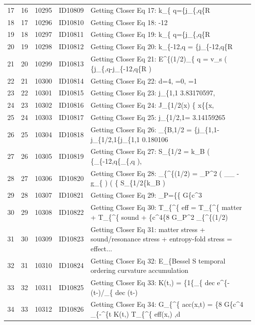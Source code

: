 \documentclass[11pt]{article}
\theoremstyle{remark}
\begin{document}
\begin{table}[H]
\begin{tabularx}{\textwidth}{rrrrL{7.2cm}}
17 & 16 & 10295 & ID10809 & Getting Closer Eq 17: k\_\{ q=\{j\_\{,q\{R \\
18 & 17 & 10296 & ID10810 & Getting Closer Eq 18: -12 \\
19 & 18 & 10297 & ID10811 & Getting Closer Eq 19: k\_\{ q=\{j\_\{,q\{R \\
20 & 19 & 10298 & ID10812 & Getting Closer Eq 20: k\_\{-12,q = \{j\_\{-12,q\{R \\
21 & 20 & 10299 & ID10813 & Getting Closer Eq 21: E\textasciicircum{}\{(1/2)\_\{ q = v\_s ( \{j\_\{,q-j\_\{-12,q\{R ) \\
22 & 21 & 10300 & ID10814 & Getting Closer Eq 22: d=4, =0, =1 \\
23 & 22 & 10301 & ID10815 & Getting Closer Eq 23: j\_\{1,1 3.83170597, \\
24 & 23 & 10302 & ID10816 & Getting Closer Eq 24: J\_\{1/2(x) \{ x\{\{x, \\
25 & 24 & 10303 & ID10817 & Getting Closer Eq 25: j\_\{1/2,1= 3.14159265 \\
26 & 25 & 10304 & ID10818 & Getting Closer Eq 26: \_\{B,1/2 = \{j\_\{1,1-j\_\{1/2,1\{j\_\{1,1 0.180106 \\
27 & 26 & 10305 & ID10819 & Getting Closer Eq 27: S\_\{1/2 = k\_B ( \{\_\{-12,q\{\_\{,q ), \\
28 & 27 & 10306 & ID10820 & Getting Closer Eq 28: \_\{\textasciicircum{}\{(1/2) = \_P\textasciicircum{}2 ( \_\_ - g\_\{ ) ( \{ S\_\{1/2\{k\_B ) \\
29 & 28 & 10307 & ID10821 & Getting Closer Eq 29: \_P=\{\{ G\{c\textasciicircum{}3 \\
30 & 29 & 10308 & ID10822 & Getting Closer Eq 30: T\_\{\textasciicircum{}\{ eff = T\_\{\textasciicircum{}\{ matter + T\_\{\textasciicircum{}\{ sound + \{c\textasciicircum{}4\{8 G\_P\textasciicircum{}2 \_\{\textasciicircum{}\{(1/2) \\
31 & 30 & 10309 & ID10823 & Getting Closer Eq 31: matter stress + sound/resonance stress + entropy-fold stress = effect... \\
32 & 31 & 10310 & ID10824 & Getting Closer Eq 32: E\_\{Bessel S temporal ordering curvature accumulation \\
33 & 32 & 10311 & ID10825 & Getting Closer Eq 33: K(t,) = \{1\{\_\{ dec e\textasciicircum{}\{-(t-)/\_\{ dec (t-) \\
34 & 33 & 10312 & ID10826 & Getting Closer Eq 34: G\_\{\textasciicircum{}\{ acc(x,t) = \{8 G\{c\textasciicircum{}4 \_\{-\textasciicircum{}\{t K(t,) T\_\{\textasciicircum{}\{ eff(x,) ,d \\

\end{tabularx}
\end{table}
\end{document}
